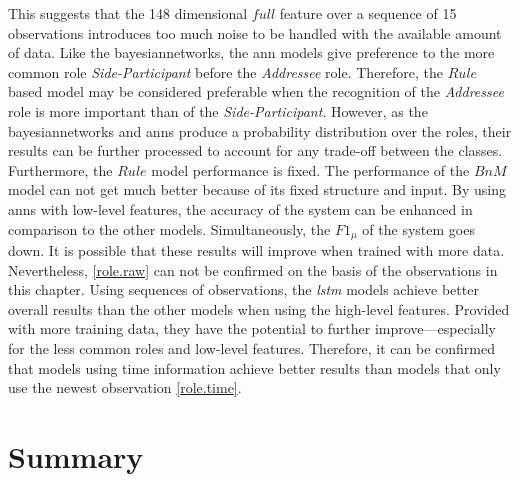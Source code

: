 This suggests that the 148 dimensional \(full\) feature over a sequence of 15 observations introduces too much noise to be handled with the available amount of data.
Like the \glspl{bayesiannetwork}, the \gls{ann} models give preference to the more common role \emph{Side-Participant} before the \emph{Addressee} role.
Therefore, the \(Rule\) based model may be considered preferable when the recognition of the \emph{Addressee} role is more important than of the \emph{Side-Participant}.
However, as the \glspl{bayesiannetwork} and \glspl{ann} produce a probability distribution over the roles, their results can be further processed to account for any trade-off between the classes.
Furthermore, the \(Rule\) model performance is fixed.
The performance of the \(BnM\) model can not get much better because of its fixed structure and input.
By using \glspl{ann} with low-level features, the \gls{accuracy} of the system can be enhanced in comparison to the other models.
Simultaneously, the \(F1_\mu\) of the system goes down.
It is possible that these results will improve when trained with more data.
Nevertheless, \cref{role.raw} can not be confirmed on the basis of the observations in this chapter.
Using sequences of observations, the \emph{lstm} models achieve better overall results than the other models when using the high-level features.
Provided with more training data, they have the potential to further improve---especially for the less common roles and low-level features.
Therefore, it can be confirmed that models using time information achieve better results than models that only use the newest observation \cref{role.time}.

\section{Summary}

